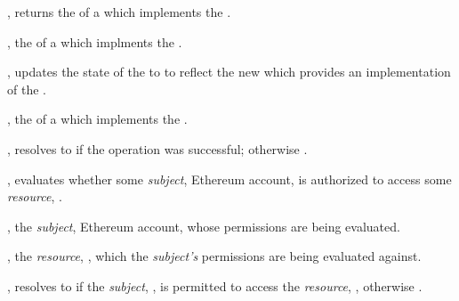 \begin{interface}
  \begin{functions}
    \item {}, returns the  of a
       which implements the .

      \begin{returns}
        \item {}, the  of a 
          which implments the .
      \end{returns}

    \item {}, updates the state of
      the  to to reflect the new  which provides
      an implementation of the .

      \begin{parameters}
        \item {}, the  of a 
          which implements the .
      \end{parameters}

      \begin{returns}
        \item {}, resolves to  if the operation was
          successful; otherwise .
      \end{returns}

    \item {},
      evaluates whether some \emph{subject}, Ethereum account, is authorized to
      access some \emph{resource}, .

      \begin{parameters}
        \item {}, the \emph{subject}, Ethereum account,
          whose permissions are being evaluated.\footnotemark{}


        \item {}, the \emph{resource}, , which the \emph{subject's} permissions are being evaluated
          against.
      \end{parameters}

      \begin{returns}
        \item {}, resolves to  if the
          \emph{subject}, , is permitted to access the
          \emph{resource}, , otherwise .
      \end{returns}
  \end{functions}
\end{interface}
